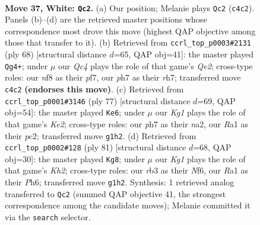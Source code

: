 \documentclass[11pt]{article}
\begin{document}
\clearpage

\begin{figure}[p]\centering
\begin{subfigure}{0.46\textwidth}\centering
\resizebox{\linewidth}{!}{%
\newchessgame
\chessboard[
  setfen={5n2/pp4kp/7p/1P6/2QP4/1r3q2/4N3/R5KR w - - 9 37},
  showmover=false,
  pgfstyle=straightmove, color=movearrow, markmove={c4-c2}
]}
\caption{}
\end{subfigure}\hfill
\begin{subfigure}{0.46\textwidth}\centering
\resizebox{\linewidth}{!}{%
\newchessgame
\chessboard[
  setfen={4R3/5pkr/p1q5/1pp5/8/1P1r2P1/4QP2/R5K1 w - - 7 35},
  showmover=false,
  pgfstyle=straightmove, color=movearrow, markmove={e2-g4}
]}
\caption{}
\end{subfigure}
\\[4pt]
\begin{subfigure}{0.46\textwidth}\centering
\resizebox{\linewidth}{!}{%
\newchessgame
\chessboard[
  setfen={8/4kp2/1p4q1/3p1R2/p3r3/P1P5/N1P1bQ1P/1K6 b - - 4 39},
  showmover=false,
  pgfstyle=straightmove, color=movearrow, markmove={e7-e6}
]}
\caption{}
\end{subfigure}\hfill
\begin{subfigure}{0.46\textwidth}\centering
\resizebox{\linewidth}{!}{%
\newchessgame
\chessboard[
  setfen={8/6pk/4qn1p/8/2PQ4/4r1PP/3N1RK1/8 b - - 4 41},
  showmover=false,
  pgfstyle=straightmove, color=movearrow, markmove={h7-g8}
]}
\caption{}
\end{subfigure}
\caption{\textbf{Move 37, White: \texttt{Qc2}.} (a) Our position; Melanie plays \texttt{Qc2} (\texttt{c4c2}). Panels (b)--(d) are the retrieved master positions whose correspondence most drove this move (highest QAP objective among those that transfer to it). (b) Retrieved from \texttt{ccrl\_top\_p0003\#2131} (ply 68) [structural distance $d$=65, QAP obj=41]: the master played \texttt{Qg4+}; under $\mu$ our \emph{Qc4} plays the role of that game's \emph{Qe2}; cross-type roles: our \emph{n}f8 as their \emph{p}f7, our \emph{p}h7 as their \emph{r}h7; transferred move \texttt{c4c2} \textbf{(endorses this move)}. (c) Retrieved from \texttt{ccrl\_top\_p0001\#3146} (ply 77) [structural distance $d$=69, QAP obj=54]: the master played \texttt{Ke6}; under $\mu$ our \emph{Kg1} plays the role of that game's \emph{Ke2}; cross-type roles: our \emph{p}h7 as their \emph{n}a2, our \emph{R}a1 as their \emph{p}c2; transferred move \texttt{g1h2}. (d) Retrieved from \texttt{ccrl\_top\_p0002\#128} (ply 81) [structural distance $d$=68, QAP obj=30]: the master played \texttt{Kg8}; under $\mu$ our \emph{Kg1} plays the role of that game's \emph{Kh2}; cross-type roles: our \emph{r}b3 as their \emph{N}f6, our \emph{R}a1 as their \emph{P}h6; transferred move \texttt{g1h2}. Synthesis: 1 retrieved analog transferred to \texttt{Qc2} (summed QAP objective 41, the strongest correspondence among the candidate moves); Melanie committed it via the \texttt{search} selector.}
\label{fig:thought-m72}
\end{figure}
\end{document}
